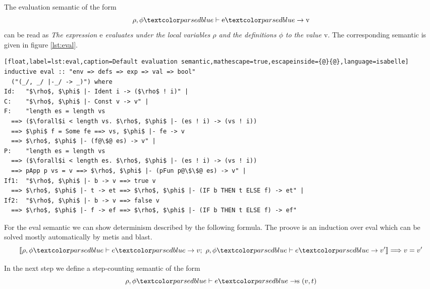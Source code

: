 The evaluation semantic of the form
\begin{equation*}
  \rho, \phi \hvdash \text{e} \hrightarrow \text{v}
\end{equation*}
can be read as \textit{The expression $\text{e}$ evaluates under the local variables $\rho$ and the definitions $\phi$ to the value $\text{v}$}. The corresponding semantic is given in figure \ref{lst:eval}.
\begin{lstlisting}[float,label=lst:eval,caption=Default evaluation semantic,mathescape=true,escapeinside={@}{@},language=isabelle]
inductive eval :: "env => defs => exp => val => bool"
  ("(_/, _/ |-_/ -> _)") where
Id:   "$\rho$, $\phi$ |- Ident i -> ($\rho$ ! i)" |
C:    "$\rho$, $\phi$ |- Const v -> v" |
F:    "length es = length vs
  ==> ($\forall$i < length vs. $\rho$, $\phi$ |- (es ! i) -> (vs ! i))
  ==> $\phi$ f = Some fe ==> vs, $\phi$ |- fe -> v
  ==> $\rho$, $\phi$ |- (f@\$@ es) -> v" |
P:    "length es = length vs
  ==> ($\forall$i < length es. $\rho$, $\phi$ |- (es ! i) -> (vs ! i))
  ==> pApp p vs = v ==> $\rho$, $\phi$ |- (pFun p@\$\$@ es) -> v" |
If1:  "$\rho$, $\phi$ |- b -> v ==> true v
  ==> $\rho$, $\phi$ |- t -> et ==> $\rho$, $\phi$ |- (IF b THEN t ELSE f) -> et" |
If2:  "$\rho$, $\phi$ |- b -> v ==> false v
  ==> $\rho$, $\phi$ |- f -> ef ==> $\rho$, $\phi$ |- (IF b THEN t ELSE f) -> ef"
\end{lstlisting}

For the eval semantic we can show determinism described by the following formula.
The proove is an induction over eval which can be solved mostly automatically by metis and blast.
\begin{equation*}
 \llbracket \rho, \phi \hvdash e \hrightarrow v; \text{ } \rho, \phi \hvdash e \hrightarrow v' \rrbracket \Longrightarrow v = v'
\end{equation*}

In the next step we define a step-counting semantic of the form
\begin{equation*}
  \rho, \phi \hvdash e \hrightarrows (v,t)
\end{equation*}

